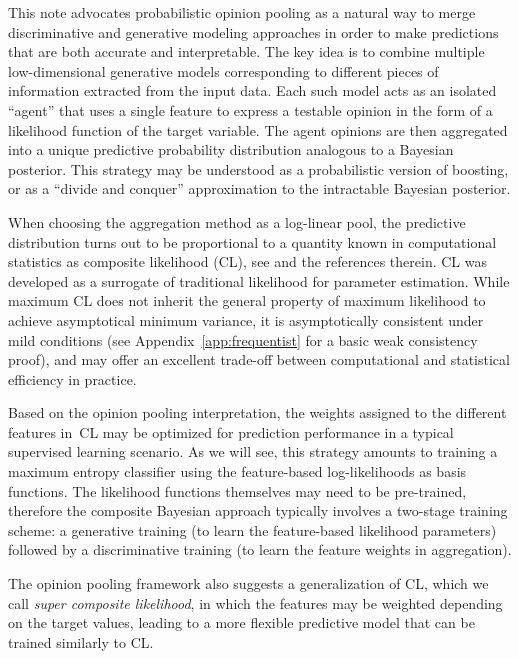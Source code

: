 \documentclass[english]{scrartcl}
\begin{document}
This note advocates probabilistic opinion pooling \cite{Genest-86} as a natural way to merge discriminative and generative modeling approaches in order to make predictions that are both accurate and interpretable. The key idea is to combine multiple low-dimensional generative models corresponding to different pieces of information extracted from the input data. Each such model acts as an isolated ``agent'' that uses a single feature to express a testable opinion in the form of a likelihood function of the target variable. The agent opinions are then aggregated into a unique predictive probability distribution analogous to a Bayesian posterior. This strategy may be understood as a probabilistic version of boosting, or as a ``divide and conquer'' approximation to the intractable Bayesian posterior. 


When choosing the aggregation method as a log-linear pool, the predictive distribution turns out to be proportional to a quantity known in computational statistics as composite likelihood (CL), see \cite{Varin-11} and the references therein. CL was developed as a surrogate of traditional likelihood for parameter estimation. While maximum CL does not inherit the general property of maximum likelihood to achieve asymptotical minimum variance, it is asymptotically consistent under mild conditions \cite{Xu-11} (see Appendix~\ref{app:frequentist} for a basic weak consistency proof), and may offer an excellent trade-off between computational and statistical efficiency in practice.

Based on the opinion pooling interpretation, the weights assigned to the different features in~CL may be optimized for prediction performance in a typical supervised learning scenario. As we will see, this strategy amounts to training a maximum entropy classifier using the feature-based log-likelihoods as basis functions. The likelihood functions themselves may need to be pre-trained, therefore the composite Bayesian approach typically involves a two-stage training scheme: a generative training (to learn the feature-based likelihood parameters) followed by a discriminative training (to learn the feature weights in aggregation).

The opinion pooling framework also suggests a generalization of CL, which we call {\em super composite likelihood}, in which the features may be weighted depending on the target values, leading to a more flexible predictive model that can be trained similarly to CL.
\end{document}
